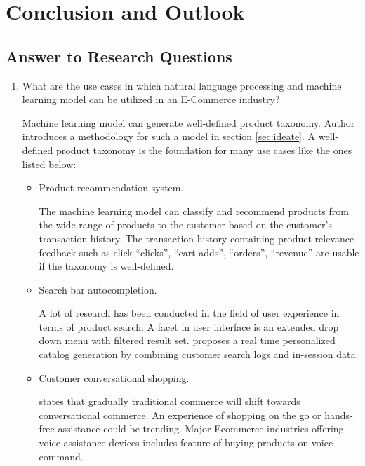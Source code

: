 \chapter{Conclusion and Outlook}


\section{Answer to Research Questions}
\begin{enumerate}[label=\textbf{RQ\arabic*:}]
    \item What are the use cases in which natural language processing and machine learning model can be utilized in an E-Commerce industry?
    
    Machine learning model can generate well-defined product taxonomy. Author introduces a methodology for such a model in section \ref{sec:ideate}. A well-defined product taxonomy is the foundation for many use cases like the ones listed below:
        \begin{itemize}
        \item Product recommendation system.
        
        The machine learning model can classify and recommend products from the wide range of products to the customer based on the customer's transaction history. The transaction history containing product relevance feedback such as click ``clicks'', ``cart-adds'', ``orders'', ``revenue'' \parencite{KarmakerSantu.2017} are usable if the taxonomy is well-defined. 
        
        \item Search bar autocompletion.
        
        A lot of research has been conducted in the field of user experience in terms of product search. A facet in user interface is an extended drop down menu with filtered result set. \parencite{Tagliabue.26052020} proposes a real time personalized catalog generation by combining customer search logs and in-session data. 
        
        \item Customer conversational shopping.
            
        \Parencite{ChrisMessina} states that gradually traditional commerce will shift towards conversational commerce. An experience of shopping on the go or hands-free assistance could be trending. Major Ecommerce  industries offering voice assistance devices includes feature of buying products on voice command.  



\end{itemize}
\end{enumerate}
